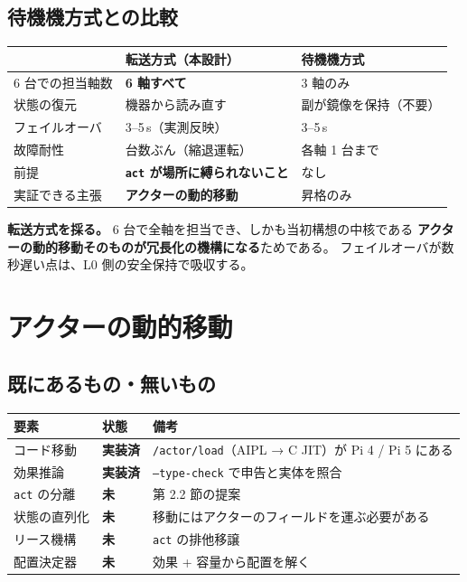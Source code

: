 \documentclass[11pt,a4paper]{article}
\newcommand{\code}[1]{\texttt{#1}}
\newcommand{\prob}[1]{\textbf{\textcolor{red!55!black}{#1}}}
\newcommand{\good}[1]{\textbf{\textcolor{green!45!black}{#1}}}
\begin{document}
\subsection{待機機方式との比較}

\begin{center}\small
\begin{tabularx}{\textwidth}{@{}l X X@{}}
\toprule
 & \textbf{転送方式（本設計）} & \textbf{待機機方式}\\
\midrule
6 台での担当軸数 & \good{6 軸すべて} & 3 軸のみ\\
状態の復元 & 機器から読み直す & 副が鏡像を保持（不要）\\
フェイルオーバ & 3--5\,s（実測反映） & 3--5\,s\\
故障耐性 & 台数ぶん（縮退運転） & 各軸 1 台まで\\
前提 & \prob{\code{act} が場所に縛られないこと} & なし\\
実証できる主張 & \good{アクターの動的移動} & 昇格のみ\\
\bottomrule
\end{tabularx}
\end{center}

\good{転送方式を採る。} 6 台で全軸を担当でき、しかも当初構想の中核である
\textbf{アクターの動的移動そのものが冗長化の機構になる}ためである。
フェイルオーバが数秒遅い点は、L0 側の安全保持で吸収する。

\section{アクターの動的移動}

\subsection{既にあるもの・無いもの}

\begin{center}\small
\begin{tabularx}{\textwidth}{@{}l l X@{}}
\toprule
\textbf{要素} & \textbf{状態} & \textbf{備考}\\
\midrule
コード移動 & \good{実装済} & \code{/actor/load}（AIPL → C JIT）が Pi 4 / Pi 5 にある\\
効果推論 & \good{実装済} & \code{--type-check} で申告と実体を照合\\
\code{act} の分離 & \prob{未} & 第 2.2 節の提案\\
状態の直列化 & \prob{未} & 移動にはアクターのフィールドを運ぶ必要がある\\
リース機構 & \prob{未} & \code{act} の排他移譲\\
配置決定器 & \prob{未} & 効果 + 容量から配置を解く\\
\bottomrule
\end{tabularx}
\end{center}
\end{document}
